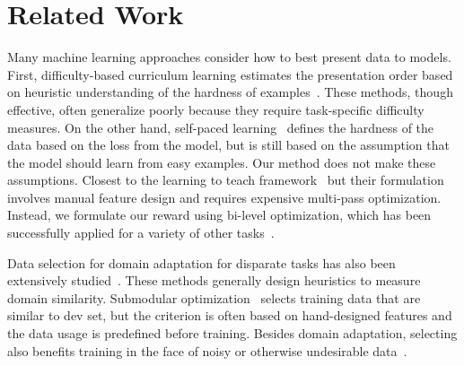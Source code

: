 \section{\label{sec:related_work}Related Work}
Many machine learning approaches consider how to best present data to models. First, difficulty-based curriculum learning estimates the presentation order based on heuristic understanding of the hardness of examples~\citep{cl_bengio,SpitkovskyAJ10,baysian_curriculum,zhang2016boosting,automate_cl_GravesBMMK17,zhang2018empirical,platanios19naacl}. These methods, though effective, often generalize poorly because they require task-specific difficulty measures. On the other hand, self-paced learning~\citep{spl_kumar,spl_visual_category} defines the hardness of the data based on the loss from the model, but is still based on the assumption that the model should learn from easy examples. Our method does not make these assumptions. Closest to the learning to teach framework~\citep{learn_to_teach} but their formulation involves manual feature design and requires expensive multi-pass optimization. Instead, we formulate our reward using bi-level optimization, which has been successfully applied for a variety of other tasks~\citep{bilevel_optim,hier_optim,darts,hyper_grad,learn_reweight}.

Data selection for domain adaptation for disparate tasks has also been extensively studied~\citep{moore2010intelligent,axelrod2011domain,domain_adapt_transfer,jiang-zhai-2007-instance,foster-etal-2010-discriminative,wang-etal-2017-instance}. These methods generally design heuristics to measure domain similarity.
Submodular optimization~\citep{submodular_mt,learn_mix_submodular} selects training data that are similar to dev set, but the criterion is often based on hand-designed features and the data usage is predefined before training. 
Besides domain adaptation, selecting also benefits training in the face of noisy or otherwise undesirable data~\citep{vyas-etal-2018-identifying,pham-etal-2018-fixing}.

